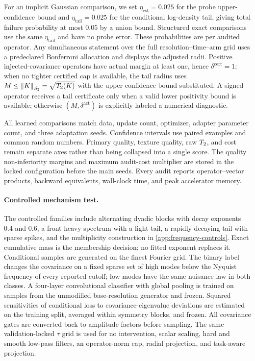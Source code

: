 For an implicit Gaussian comparison, we set
$\eta_{\mathrm{est}}=0.025$ for the probe upper-confidence bound and
$\eta_{\mathrm{tail}}=0.025$ for the conditional log-density tail, giving
total failure probability at most $0.05$ by a union bound. Structured exact
comparisons use the same $\eta_{\mathrm{tail}}$ and have no probe error.
These probabilities are per audited operator. Any simultaneous statement over
the full resolution--time--arm grid uses a predeclared Bonferroni allocation
and displays the adjusted radii.
Positive injected-covariance operators have actual margin at least one, hence
$\delta^{\mathrm{cert}}=1$; when no tighter certified cap is available, the tail radius uses
$M\le\left\lVert K \right\rVert_{\mathcal{S}_{2}}=\sqrt{T_2(K)}$ with the upper confidence bound substituted.
A signed operator receives a tail certificate only when a valid lower
positivity bound is available; otherwise $(M,\delta^{\mathrm{act}})$ is explicitly labeled a
numerical diagnostic.

All learned comparisons match data, update count, optimizer, adapter parameter
count, and three adaptation seeds. Confidence intervals use paired examples and
common random numbers. Primary quality, texture quality, raw $T_2$, and cost
remain separate axes rather than being collapsed into a single score. The
quality non-inferiority margins and maximum audit-cost multiplier are stored in
the locked configuration before the main seeds. Every audit reports
operator--vector products, backward equivalents, wall-clock time, and peak
accelerator memory.

\paragraph{Controlled mechanism test.}
The controlled families include alternating dyadic blocks with decay exponents
$0.4$ and $0.6$, a front-heavy spectrum with a light tail, a rapidly decaying
tail with sparse spikes, and the multiplicity construction in
\cref{app:frequency-controls}. Exact cumulative mass is the membership
decision; no fitted exponent replaces it. Conditional samples are generated on
the finest Fourier grid. The binary label changes the covariance on a fixed
sparse set of high modes below the Nyquist frequency of every reported cutoff;
low modes have the same nuisance law in both classes. A four-layer convolutional
classifier with global pooling is trained on samples from the unmodified
base-resolution generator and frozen. Squared sensitivities of conditional loss
to covariance-eigenvalue deviations are estimated on the training split,
averaged within symmetry blocks, and frozen. All covariance gates are converted
back to amplitude factors before sampling. The same validation-locked $\tau$
grid is used for no intervention, scalar scaling, hard and smooth low-pass
filters, an operator-norm cap, radial projection, and task-aware projection.

